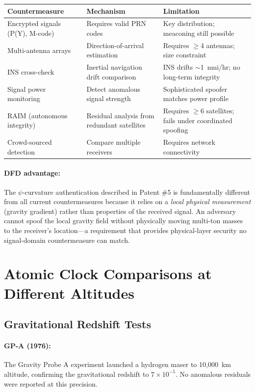 \documentclass[12pt,letterpaper]{article}
\begin{document}
\begin{longtable}{@{}p{3.5cm}p{5cm}p{5cm}@{}}
\toprule
Countermeasure & Mechanism & Limitation \\
\midrule
\endhead
Encrypted signals (P(Y), M-code) & Requires valid PRN codes & Key
distribution; meaconing still possible \\
Multi-antenna arrays & Direction-of-arrival estimation & Requires
$\geq$4 antennas; size constraint \\
INS cross-check & Inertial navigation drift comparison & INS drifts
$\sim$1~nmi/hr; no long-term integrity \\
Signal power monitoring & Detect anomalous signal strength & Sophisticated
spoofer matches power profile \\
RAIM (autonomous integrity) & Residual analysis from redundant satellites
& Requires $\geq$6 satellites; fails under coordinated spoofing \\
Crowd-sourced detection & Compare multiple receivers & Requires network
connectivity \\
\bottomrule
\end{longtable}

\paragraph{DFD advantage:}
The $\psi$-curvature authentication described in Patent \#5 is
fundamentally different from all current countermeasures because it
relies on a \emph{local physical measurement} (gravity gradient) rather
than properties of the received signal. An adversary cannot spoof the
local gravity field without physically moving multi-ton masses to the
receiver's location---a requirement that provides physical-layer security
no signal-domain countermeasure can match.

\section{Atomic Clock Comparisons at Different Altitudes}

\subsection{Gravitational Redshift Tests}

\paragraph{GP-A (1976):} The Gravity Probe A experiment launched a hydrogen
maser to 10,000~km altitude, confirming the gravitational redshift to
$7\times10^{-5}$. No anomalous residuals were reported at this precision.
\end{document}
